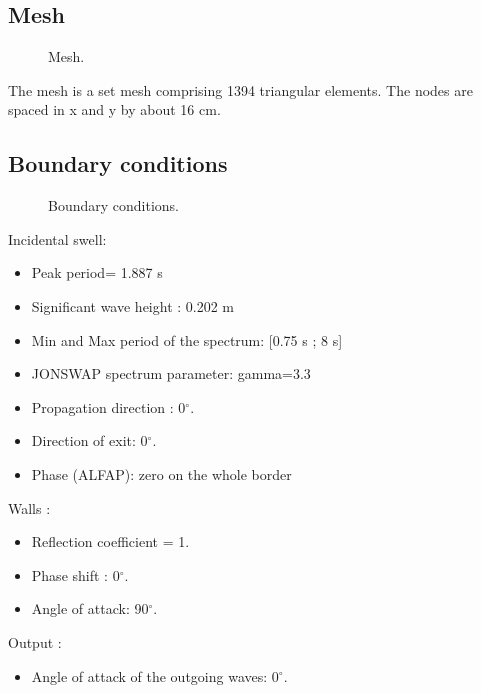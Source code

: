 \subsection{Mesh}
\begin{figure}[h]
\begin{center}
\end{center}
\caption{Mesh.}
\label{fig:bj78_mesh}
\end{figure}

The mesh is a set mesh comprising 1394 triangular elements. The nodes are
spaced in x and y by about 16 cm.

\subsection{Boundary conditions}
\begin{figure}[h]
\begin{center}
\end{center}
\caption{Boundary conditions.}
\label{fig:bj78_bc}
\end{figure}

Incidental swell:
\begin{itemize}
\item Peak period= 1.887 s
\item Significant wave height : 0.202 m
\item Min and Max period of the spectrum: [0.75 s ; 8 s]
\item JONSWAP spectrum parameter: gamma=3.3
\item Propagation direction : 0$^\circ$.
\item Direction of exit: 0$^\circ$.
\item Phase (ALFAP): zero on the whole border
\end{itemize}

Walls :
\begin{itemize}
\item Reflection coefficient = 1.
\item Phase shift : 0$^\circ$.
\item Angle of attack: 90$^\circ$.
\end{itemize}

Output :
\begin{itemize}
\item Angle of attack of the outgoing waves: 0$^\circ$.
\end{itemize}

